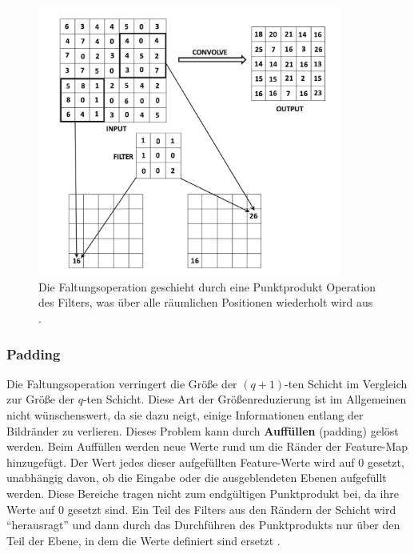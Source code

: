     \begin{figure}[H]
        \centering
        \includegraphics[width=10cm]{kapitel2/conv_layers.png}
        \caption[Die Faltung in einem CNN]{Die Faltungsoperation geschieht durch eine Punktprodukt Operation des Filters, was über alle räumlichen Positionen wiederholt wird aus \cite*[321]{Aggarwal2018}.}
        \label{Kap2:Conv}
    \end{figure}

    \subsubsection{Padding}
    Die Faltungsoperation verringert die Größe der $(q + 1)$-ten Schicht im Vergleich zur Größe der $q$-ten Schicht. Diese Art der Größenreduzierung ist im Allgemeinen nicht wünschenswert, da sie dazu neigt, einige Informationen entlang der Bildränder zu verlieren. Dieses Problem kann durch \textbf{Auffüllen} (padding) gelöst werden. Beim Auffüllen werden neue Werte rund um die Ränder der Feature-Map hinzugefügt. Der Wert jedes dieser aufgefüllten Feature-Werte wird auf 0 gesetzt, unabhängig davon, ob die Eingabe oder die ausgeblendeten Ebenen aufgefüllt werden. Diese Bereiche tragen nicht zum endgültigen Punktprodukt bei, da ihre Werte auf 0 gesetzt sind. Ein Teil des Filters aus den Rändern der Schicht wird \enquote{herausragt} und dann durch das Durchführen des Punktprodukts nur über den Teil der Ebene, in dem die Werte definiert sind ersetzt \cite*[323]{Aggarwal2018}.



